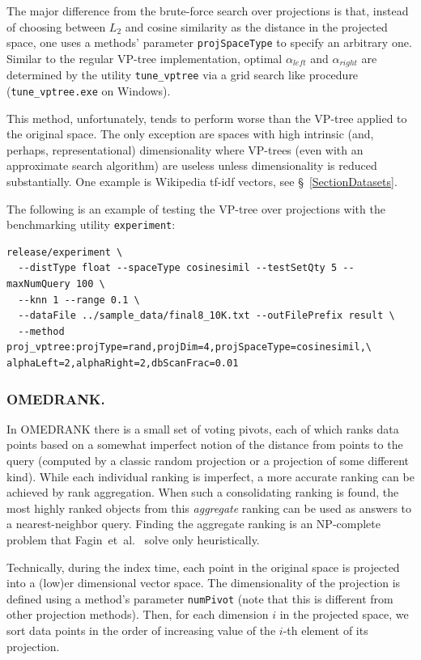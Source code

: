 \documentclass[runningheads,a4paper]{llncs}
\newcommand{\ttt}[1]{\texttt{#1}}
\begin{document}
{The major difference from the brute-force search over projections is that, instead of choosing between $L_2$ and cosine similarity as the distance
in the projected space, one uses a methods' parameter \ttt{projSpaceType} to specify an arbitrary one.
Similar to the regular VP-tree implementation,
optimal $\alpha_{left}$ and $\alpha_{right}$ are determined by the utility \ttt{tune\_vptree} via a grid search like procedure (\ttt{tune\_vptree.exe} on Windows). 

This method, unfortunately, tends to perform worse than the VP-tree applied to the original space. 
The only exception are spaces with high intrinsic (and, perhaps, representational) dimensionality
where VP-trees (even with an approximate search algorithm) are useless unless dimensionality is reduced substantially.
One example is Wikipedia tf-idf vectors, see \S~\ref{SectionDatasets}.

The following is an example of testing the VP-tree over projections with the benchmarking utility \ttt{experiment}:
{
\footnotesize
\begin{verbatim}
release/experiment \
  --distType float --spaceType cosinesimil --testSetQty 5 --maxNumQuery 100 \
  --knn 1 --range 0.1 \
  --dataFile ../sample_data/final8_10K.txt --outFilePrefix result \
  --method proj_vptree:projType=rand,projDim=4,projSpaceType=cosinesimil,\
alphaLeft=2,alphaRight=2,dbScanFrac=0.01
\end{verbatim}
}

\subsubsection{\textbf{OMEDRANK}.}\label{SectionOmedrank}
In OMEDRANK \cite{Fagin2003} there is a small set of voting pivots,
each of which ranks data points based on a somewhat imperfect notion of the distance from points to the query (computed
by a classic random projection or a projection of some different kind).
While each individual ranking is imperfect,
a more accurate ranking can be achieved by rank aggregation. 
When such a consolidating ranking is found, the most highly ranked objects from this
\emph{aggregate} ranking can be used as answers to a nearest-neighbor query.
Finding the aggregate ranking is an NP-complete problem that Fagin~et~al.~\cite{Fagin2003} solve only heuristically.

Technically, during the index time, each point in the original space is projected into a (low)er dimensional
vector space. The dimensionality of the projection is defined using a method's parameter  \ttt{numPivot}
(note that this is different from other projection methods).
Then, for each dimension $i$ in the projected space, we sort data points in the order of increasing value of
the \mbox{$i$-th} element of its projection.

}
\end{document}
